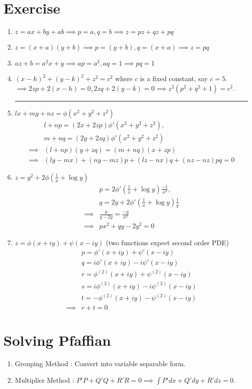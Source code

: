 \section*{Exercise}
\begin{enumerate}
	\item $z = ax+by+ab \implies p = a, q=b \implies z = pz+qz+pq$
	\item $z = (x+a)(y+b) \implies p = (y+b),q = (x+a) \implies z = pq$
	\item $az+b = a^2x + y \implies ap = a^2,aq=1 \implies pq = 1$
	\item $(x-h)^2 + (y-k)^2 + z^2 = c^2$ where $c$ is a fixed constant, say $c = 5$.\\
		$\implies 2zp + 2(x-h) = 0, 2zq + 2(y-k) = 0 \implies z^2(p^2 + q^2 + 1) = c^2$.
	\hrule
\item $lx+my+nz = \phi(x^2+y^2+z^2)$ 
\begin{align*}
	& l+np = (2x+2zp)\phi'(x^2+y^2+z^2),\\
	& m+nq  = (2y+2zq)\phi'(x^2+y^2+z^2) \\
	\implies & (l+np)(y+zq)  = (m+nq)(x+zp) \\
	\implies & (ly-mx)+(ny-mz)p + (lz-nx)q + (nz-nz)pq = 0
\end{align*}
\item $z = y^2 + 2\phi(\frac{1}{x} + \log y)$ 
\begin{align*}
	& p = 2\phi'(\frac{1}{x}+\log y) \frac{-1}{x^2},\\
	& q = 2y + 2\phi'(\frac{1}{x} + \log y) \frac{1}{y}\\
	\implies & \frac{p}{q-2y} = \frac{-y}{x^2}\\
	\implies & px^2+qy-2y^2 = 0
\end{align*}
\item $z = \phi(x+iy)+\psi(x-iy)$ (two functions expect second order PDE)
\begin{align*}
	& p = \phi'(x+iy) + \psi'(x-iy)\\
	& q = i\phi'(x+iy) -i \psi'(x-iy)\\
	& r = \phi^{(2)}(x+iy) + \psi^{(2)}(x-iy) \\
	& s = i\phi^{(2)}(x+iy) -i \psi^{(2)}(x-iy) \\
	& t = -\phi^{(2)}(x+iy) -\psi^{(2)}(x-iy)\\
	\implies & r+t = 0
\end{align*}
\end{enumerate}

\section{Solving Pfaffian}
\begin{enumerate}
	\item Grouping Method : Convert into variable separable form.
	\item Multiplier Method : $P'P+Q'Q+R'R = 0 \implies \int P'dx + Q'dy + R'dz = 0$.
\end{enumerate}

